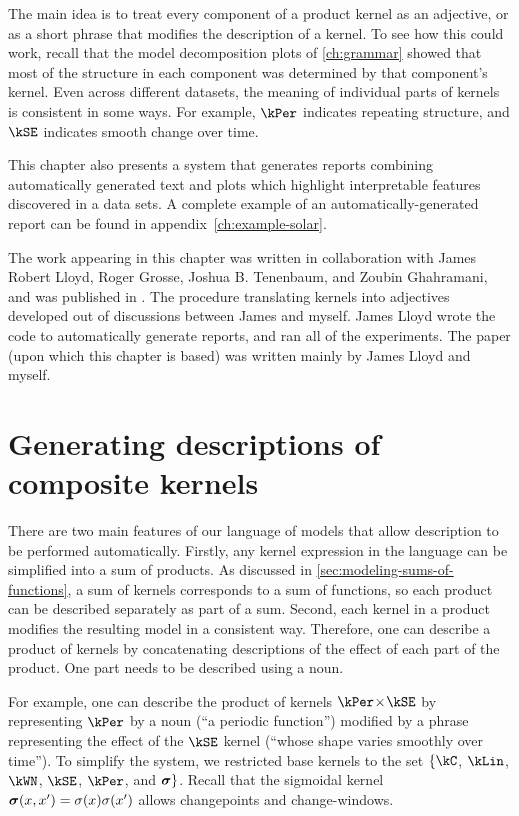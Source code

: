The main idea is to treat every component of a product kernel as an adjective, or as a short phrase that modifies the description of a kernel.
To see how this could work, recall that the model decomposition plots of \cref{ch:grammar} showed that most of the structure in each component was determined by that component's kernel.
Even across different datasets, the meaning of individual parts of kernels is consistent in some ways.
For example, $\kPer$ indicates repeating structure, and $\kSE$ indicates smooth change over time.

This chapter also presents a system that generates reports combining automatically generated text and plots which highlight interpretable features discovered in a data sets.
A complete example of an automatically-generated report can be found in appendix~\ref{ch:example-solar}.

The work appearing in this chapter was written in collaboration with James Robert Lloyd, Roger Grosse, Joshua B. Tenenbaum, and Zoubin Ghahramani, and was published in \citet{LloDuvGroetal14}.
The procedure translating kernels into adjectives developed out of discussions between James and myself.
James Lloyd wrote the code to automatically generate reports, and ran all of the experiments.
The paper (upon which this chapter is based) was written mainly by James Lloyd and myself.%


\section{Generating descriptions of composite kernels}

There are two main features of our language of \gp{} models that allow description to be performed automatically.
Firstly, any kernel expression in the language can be simplified into a sum of products.
As discussed in \cref{sec:modeling-sums-of-functions}, a sum of kernels corresponds to a sum of functions, so each product can be described separately as part of a sum.
Second, each kernel in a product modifies the resulting model in a consistent way.
Therefore, one can describe a product of kernels by concatenating descriptions of the effect of each part of the product.
One part needs to be described using a noun.

For example, one can describe the product of kernels $\kPer \kerntimes \kSE$ by representing $\kPer$ by a noun (``a periodic function'') modified by a phrase representing the effect of the $\kSE$ kernel (``whose shape varies smoothly over time'').
To simplify the system, we restricted base kernels to the set $\{\kC$, $\kLin$, $\kWN$, $\kSE$, $\kPer$, and ${\boldsymbol{\sigma}}\}$.
Recall that the sigmoidal kernel ${\boldsymbol{\sigma}}(x, x') = \sigma(x)\sigma(x')$ allows changepoints and change-windows.


